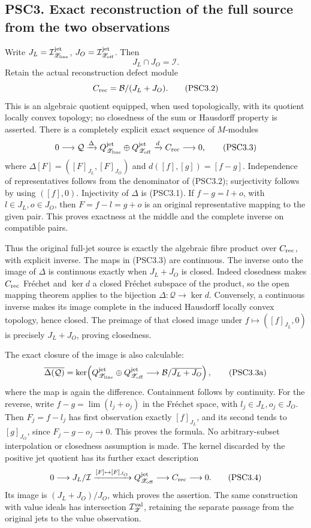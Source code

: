 \subsection{PSC3. Exact reconstruction of the full source from the two
observations}\label{psc3.-exact-reconstruction-of-the-full-source-from-the-two-observations}

Write \(J_L=\mathcal I_{\mathscr Z_{\rm line}}^{\rm jet}\),
\(J_O=\mathcal I_{\mathscr Z_{\rm off}}^{\rm jet}\). Then \[
J_L\cap J_O=\mathcal I.
\tag{PSC3.1}
\] Retain the actual reconstruction defect module \[
C_{\rm rec}=\mathcal B/(J_L+J_O).
\tag{PSC3.2}
\] This is an algebraic quotient equipped, when used topologically, with
its quotient locally convex topology; no closedness of the sum or
Hausdorff property is asserted. There is a completely explicit exact
sequence of \(M\)-modules \[
0\longrightarrow\mathcal Q
\xrightarrow{\Delta}Q_{\mathscr Z_{\rm line}}^{\rm jet}\oplus Q_{\mathscr Z_{\rm off}}^{\rm jet}
\xrightarrow{d}C_{\rm rec}\longrightarrow0,
\tag{PSC3.3}
\] where \(\Delta[F]=([F]_{J_L},[F]_{J_O})\) and \(d([f],[g])=[f-g]\).
Independence of representatives follows from the denominator of
(PSC3.2); surjectivity follows by using \(([f],0)\). Injectivity of
\(\Delta\) is (PSC3.1). If \(f-g=l+o\), with \(l\in J_L,o\in J_O\), then
\(F=f-l=g+o\) is an original representative mapping to the given pair.
This proves exactness at the middle and the complete inverse on
compatible pairs.

Thus the original full-jet source is exactly the algebraic fibre product
over \(C_{\rm rec}\), with explicit inverse. The maps in (PSC3.3) are
continuous. The inverse onto the image of \(\Delta\) is continuous
exactly when \(J_L+J_O\) is closed. Indeed closedness makes
\(C_{\rm rec}\) Fréchet and \(\ker d\) a closed Fréchet subspace of the
product, so the open mapping theorem applies to the bijection
\(\Delta:\mathcal Q\to\ker d\). Conversely, a continuous inverse makes
its image complete in the induced Hausdorff locally convex topology,
hence closed. The preimage of that closed image under
\(f\mapsto([f]_{J_L},0)\) is precisely \(J_L+J_O\), proving closedness.

The exact closure of the image is also calculable: \[
\overline{\Delta(\mathcal Q)}
=\ker\!\left(
Q_{\mathscr Z_{\rm line}}^{\rm jet}\oplus Q_{\mathscr Z_{\rm off}}^{\rm jet}
\longrightarrow \mathcal B/\overline{J_L+J_O}\right),
\tag{PSC3.3a}
\] where the map is again the difference. Containment follows by
continuity. For the reverse, write \(f-g=\lim(l_j+o_j)\) in the Fréchet
space, with \(l_j\in J_L,o_j\in J_O\). Then \(F_j=f-l_j\) has first
observation exactly \([f]_{J_L}\), and its second tends to
\([g]_{J_O}\), since \(F_j-g-o_j\to0\). This proves the formula. No
arbitrary-subset interpolation or closedness assumption is made. The
kernel discarded by the positive jet quotient has its further exact
description \[
0\longrightarrow J_L/\mathcal I
\xrightarrow{[F]\mapsto[F]_{J_O}} Q_{\mathscr Z_{\rm off}}^{\rm jet}
\longrightarrow C_{\rm rec}\longrightarrow0.
\tag{PSC3.4}
\] Its image is \((J_L+J_O)/J_O\), which proves the assertion. The same
construction with value ideals has intersection
\(\mathcal I_{\mathscr Z}^{\rm val}\), retaining the separate passage
from the original jets to the value observation.

